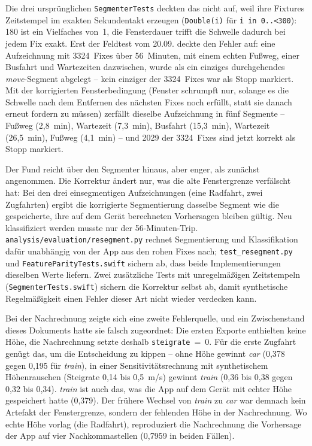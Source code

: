\documentclass[11pt,a4paper,oneside]{article}
\begin{document}
Die drei ursprünglichen \texttt{SegmenterTests} deckten das nicht auf, weil
ihre Fixtures Zeitstempel im exakten Sekundentakt erzeugen (\texttt{Double(i)}
für \texttt{i in 0..<300}): 180 ist ein Vielfaches von~1, die Fensterdauer
trifft die Schwelle dadurch bei jedem Fix exakt. Erst der Feldtest vom
20.09. deckte den Fehler auf: eine Aufzeichnung mit 3324~Fixes über
56~Minuten, mit einem echten Fußweg, einer Busfahrt und Wartezeiten
dazwischen, wurde als ein einziges durchgehendes \emph{move}-Segment
abgelegt -- kein einziger der 3324~Fixes war als Stopp markiert. Mit der
korrigierten Fensterbedingung (Fenster schrumpft nur, solange es die
Schwelle nach dem Entfernen des nächsten Fixes noch erfüllt, statt sie
danach erneut fordern zu müssen) zerfällt dieselbe Aufzeichnung in fünf
Segmente -- Fußweg (2{,}8~min), Wartezeit (7{,}3~min), Busfahrt
(15{,}3~min), Wartezeit (26{,}5~min), Fußweg (4{,}1~min) -- und 2029 der
3324~Fixes sind jetzt korrekt als Stopp markiert.

Der Fund reicht über den Segmenter hinaus, aber enger, als zunächst
angenommen. Die Korrektur ändert nur, was die alte Fenstergrenze
verfälscht hat: Bei den drei einsegmentigen Aufzeichnungen (eine
Radfahrt, zwei Zugfahrten) ergibt die korrigierte Segmentierung dasselbe
Segment wie die gespeicherte, ihre auf dem Gerät berechneten Vorhersagen
bleiben gültig. Neu klassifiziert werden musste nur der 56-Minuten-Trip.
\texttt{analysis/evaluation/resegment.py} rechnet Segmentierung und
Klassifikation dafür unabhängig von der App aus den rohen Fixes nach;
\texttt{test\_resegment.py} und \texttt{FeatureParityTests.swift} sichern
ab, dass beide Implementierungen dieselben Werte liefern. Zwei zusätzliche
Tests mit unregelmäßigen Zeitstempeln (\texttt{SegmenterTests.swift})
sichern die Korrektur selbst ab, damit synthetische Regelmäßigkeit einen
Fehler dieser Art nicht wieder verdecken kann.

Bei der Nachrechnung zeigte sich eine zweite Fehlerquelle, und ein
Zwischenstand dieses Dokuments hatte sie falsch zugeordnet: Die ersten
Exporte enthielten keine Höhe, die Nachrechnung setzte deshalb
\texttt{steigrate}~=~0. Für die erste Zugfahrt genügt das, um die
Entscheidung zu kippen -- ohne Höhe gewinnt \emph{car} (0{,}378 gegen
0{,}195 für \emph{train}), in einer Sensitivitätsrechnung mit synthetischem
Höhenrauschen (Steigrate 0{,}14 bis 0{,}5~m/s) gewinnt \emph{train}
(0{,}36 bis 0{,}38 gegen 0{,}32 bis 0{,}34). \emph{train} ist auch das, was
die App auf dem Gerät mit echter Höhe gespeichert hatte (0{,}379). Der
frühere Wechsel von \emph{train} zu \emph{car} war demnach kein Artefakt der
Fenstergrenze, sondern der fehlenden Höhe in der Nachrechnung. Wo echte
Höhe vorlag (die Radfahrt), reproduziert die Nachrechnung die
Vorhersage der App auf vier Nachkommastellen (0{,}7959 in beiden Fällen).
\end{document}
